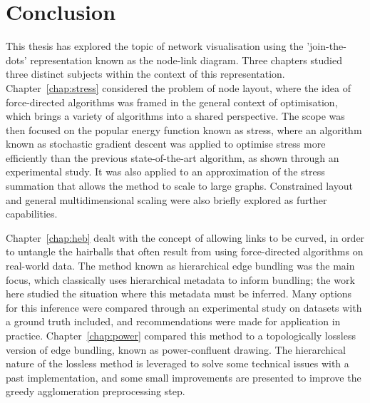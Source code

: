 \chapter*{Conclusion}
\label{chap:conclusion}

This thesis has explored the topic of network visualisation using the 'join-the-dots' representation known as the node-link diagram.
Three chapters studied three distinct subjects within the context of this representation.
Chapter~\ref{chap:stress} considered the problem of node layout, where the idea of force-directed algorithms was framed in the general context of optimisation, which brings a variety of algorithms into a shared perspective.
The scope was then focused on the popular energy function known as stress, where an algorithm known as stochastic gradient descent was applied to optimise stress more efficiently than the previous state-of-the-art algorithm, as shown through an experimental study.
It was also applied to an approximation of the stress summation that allows the method to scale to large graphs.
Constrained layout and general multidimensional scaling were also briefly explored as further capabilities.

Chapter~\ref{chap:heb} dealt with the concept of allowing links to be curved, in order to untangle the hairballs that often result from using force-directed algorithms on real-world data. The method known as hierarchical edge bundling was the main focus, which classically uses hierarchical metadata to inform bundling; the work here studied the situation where this metadata must be inferred. Many options for this inference were compared through an experimental study on datasets with a ground truth included, and recommendations were made for application in practice.
Chapter~\ref{chap:power} compared this method to a topologically lossless version of edge bundling, known as power-confluent drawing. The hierarchical nature of the lossless method is leveraged to solve some technical issues with a past implementation, and some small improvements are presented to improve the greedy agglomeration preprocessing step.


